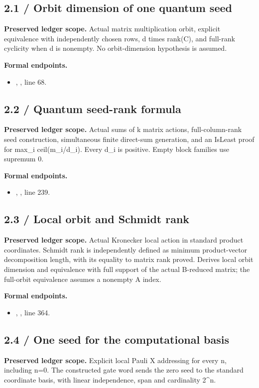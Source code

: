 \subsection{2.1 / Orbit dimension of one quantum seed}
\label{result:2.1}
\textbf{Preserved ledger scope.} Actual matrix multiplication orbit, explicit equivalence with independently chosen rows, d times rank(C), and full-rank cyclicity when d is nonempty. No orbit-dimension hypothesis is assumed.

\textbf{Formal endpoints.}\begin{itemize}
\item {}, , line 68.
\end{itemize}
\subsection{2.2 / Quantum seed-rank formula}
\label{result:2.2}
\textbf{Preserved ledger scope.} Actual sums of k matrix actions, full-column-rank seed construction, simultaneous finite direct-sum generation, and an IsLeast proof for max\_i ceil(m\_i/d\_i). Every d\_i is positive. Empty block families use supremum 0.

\textbf{Formal endpoints.}\begin{itemize}
\item {}, , line 239.
\end{itemize}
\subsection{2.3 / Local orbit and Schmidt rank}
\label{result:2.3}
\textbf{Preserved ledger scope.} Actual Kronecker local action in standard product coordinates. Schmidt rank is independently defined as minimum product-vector decomposition length, with its equality to matrix rank proved. Derives local orbit dimension and equivalence with full support of the actual B-reduced matrix; the full-orbit equivalence assumes a nonempty A index.

\textbf{Formal endpoints.}\begin{itemize}
\item {}, , line 364.
\end{itemize}
\subsection{2.4 / One seed for the computational basis}
\label{result:2.4}
\textbf{Preserved ledger scope.} Explicit local Pauli X addressing for every n, including n=0. The constructed gate word sends the zero seed to the standard coordinate basis, with linear independence, span and cardinality 2\textasciicircum{}n.

